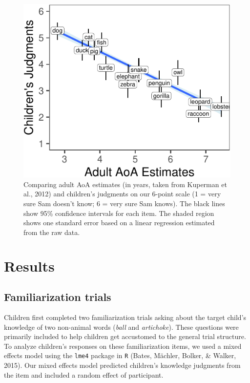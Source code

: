 \documentclass[10pt, letterpaper]{article}
\newenvironment{CodeChunk}{}{}
\begin{document}
\begin{CodeChunk}
\begin{figure}[tb]
\includegraphics{figs/overall-1} \caption[Comparing adult AoA estimates (in years, taken from Kuperman et al., 2012) and children’s judgments on our 6-point scale (1 = very sure Sam doesn’t know]{Comparing adult AoA estimates (in years, taken from Kuperman et al., 2012) and children’s judgments on our 6-point scale (1 = very sure Sam doesn’t know; 6 = very sure Sam knows). The black lines show 95\% confidence intervals for each item. The shaded region shows one standard error based on a linear regression estimated from the raw data.}\label{fig:overall}
\end{figure}
\end{CodeChunk}

\hypertarget{results}{%
\section{Results}\label{results}}

\hypertarget{familiarization-trials}{%
\subsection{Familiarization trials}\label{familiarization-trials}}

Children first completed two familiarization trials asking about the
target child's knowledge of two non-animal words (\emph{ball} and
\emph{artichoke}). These questions were primarily included to help
children get accustomed to the general trial structure. To analyze
children's responses on these familiarization items, we used a mixed
effects model using the \texttt{lme4} package in \texttt{R} (Bates,
Mächler, Bolker, \& Walker, 2015). Our mixed effects model predicted
children's knowledge judgments from the item and included a random
effect of participant.
\end{document}
